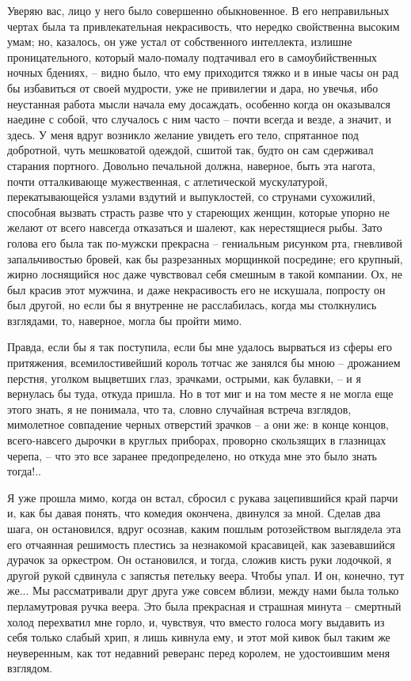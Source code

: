 Уверяю   вас,   лицо   у  него  было  совершенно  обыкновенное.  В  его
неправильных  чертах  была  та  привлекательная  некрасивость,  что  нередко
свойственна  высоким  умам;  но,  казалось,  он  уже  устал  от собственного
интеллекта, излишне проницательного, который мало-помалу  подтачивал  его  в
самоубийственных ночных бдениях, -- видно было, что ему приходится тяжко и в
иные  часы он рад бы избавиться от своей мудрости, уже не привилегии и дара,
но увечья, ибо неустанная работа мысли начала ему досаждать, особенно  когда
он  оказывался  наедине с собой, что случалось с ним часто -- почти всегда и
везде, а значит, и здесь. У меня вдруг возникло желание  увидеть  его  тело,
спрятанное  под добротной, чуть мешковатой одеждой, сшитой так, будто он сам
сдерживал старания портного. Довольно печальной должна, наверное,  быть  эта
нагота,   почти  отталкивающе  мужественная,  с  атлетической  мускулатурой,
перекатывающейся  узлами  вздутий  и  выпуклостей,  со  струнами  сухожилий,
способная  вызвать  страсть  разве что у стареющих женщин, которые упорно не
желают от всего навсегда отказаться и шалеют, как  нерестящиеся  рыбы.  Зато
голова  его  была  так  по-мужски  прекрасна  --  гениальным  рисунком  рта,
гневливой запальчивостью бровей, как бы разрезанных морщинкой посредине; его
крупный, жирно лоснящийся нос даже чувствовал себя смешным в такой компании.
Ох, не был красив  этот  мужчина,  и  даже  некрасивость  его  не  искушала,
попросту  он  был  другой,  но если бы я внутренне не расслабилась, когда мы
столкнулись взглядами, то, наверное, могла бы пройти мимо.

Правда, если бы я так поступила, если бы мне удалось вырваться из сферы
его притяжения,  всемилостивейший  король  тотчас  же  занялся  бы  мною  --
дрожанием  перстня,  уголком выцветших глаз, зрачками, острыми, как булавки,
-- и я вернулась бы туда, откуда пришла. Но в тот миг и на том  месте  я  не
могла  еще  этого  знать,  я  не  понимала, что та, словно случайная встреча
взглядов, мимолетное совпадение черных отверстий зрачков  --  а  они  же:  в
конце  концов, всего-навсего дырочки в круглых приборах, проворно скользящих
в глазницах черепа, -- что это все заранее предопределено, но откуда мне это
было знать тогда!..

Я уже прошла мимо, когда он встал, сбросил с рукава  зацепившийся  край
парчи и, как бы давая понять, что комедия окончена, двинулся за мной. Сделав
два шага, он остановился, вдруг осознав, каким пошлым ротозейством выглядела
эта   его   отчаянная  решимость  плестись  за  незнакомой  красавицей,  как
зазевавшийся дурачок за оркестром. Он остановился,  и  тогда,  сложив  кисть
руки  лодочкой,  я  другой  рукой  сдвинула с запястья петельку веера. Чтобы
упал. И он, конечно, тут  же...  Мы  рассматривали  друг  друга  уже  совсем
вблизи,   между  нами  была  только  перламутровая  ручка  веера.  Это  была
прекрасная и страшная минута -- смертный  холод  перехватил  мне  горло,  и,
чувствуя, что вместо голоса могу выдавить из себя только слабый хрип, я лишь
кивнула  ему,  и  этот  мой кивок был таким же неуверенным, как тот недавний
реверанс перед королем, не удостоившим меня взглядом.

